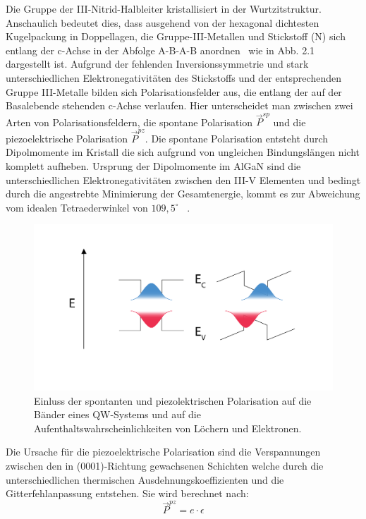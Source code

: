 Die Gruppe der III-Nitrid-Halbleiter kristallisiert in der Wurtzitstruktur. Anschaulich bedeutet dies, dass ausgehend von der hexagonal dichtesten Kugelpackung in Doppellagen, die Gruppe-III-Metallen und Stickstoff (N) sich entlang der c-Achse in der Abfolge A-B-A-B anordnen~\cite{buchc} wie in Abb. 2.1 dargestellt ist. 
\newline
Aufgrund der fehlenden Inversionssymmetrie und stark unterschiedlichen Elektronegativitäten des Stickstoffs und der entsprechenden Gruppe III-Metalle bilden sich Polarisationsfelder aus, die entlang der auf der Basalebende stehenden c-Achse verlaufen. Hier unterscheidet man zwischen zwei Arten von Polarisationsfeldern, die spontane Polarisation $ \vec{P}^{sp} $ und die piezoelektrische Polarisation $ \vec{P}^{pz} $.
\newline\newline
Die spontane Polarisation entsteht durch Dipolmomente im Kristall die sich aufgrund von ungleichen Bindungslängen nicht komplett aufheben. Ursprung der 
Dipolmomente im AlGaN sind die unterschiedlichen Elektronegativitäten zwischen den III-V Elementen und bedingt durch die angestrebte Minimierung der Gesamtenergie, kommt es zur Abweichung vom idealen Tetraederwinkel von $109,5^{\circ}$ ~\cite{ambacher2002}.
%
\begin{figure}[htb]
    \centering
    \begin{minipage}[t]{0.7\linewidth}
        \centering
        \includegraphics[width=\linewidth]{Bilder/QCSE.pdf}
        \caption{Einluss der spontanten und piezolektrischen Polarisation auf die Bänder eines QW-Systems und auf die Aufenthaltswahrscheinlichkeiten von Löchern und Elektronen.}
        \label{fig:qcse}
    \end{minipage}%
\end{figure}
\vspace{1cm}
\raggedright
\newpage
Die Ursache für die piezoelektrische Polarisation sind die Verspannungen zwischen den in (0001)-Richtung gewachsenen Schichten welche durch die unterschiedlichen thermischen Ausdehnungskoeffizienten und die Gitterfehlanpassung entstehen. Sie wird berechnet nach: 
%
\begin{equation}
    \vec{P}^{pz} = e \cdot \epsilon
\end{equation}
%
